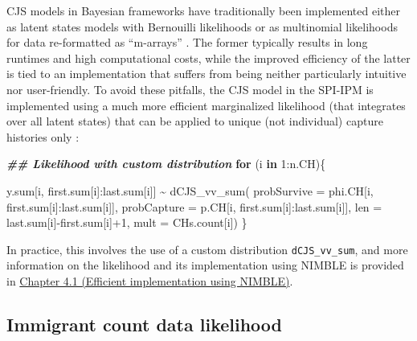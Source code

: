 \documentclass[
]{book}
\newenvironment{Shaded}{\begin{snugshade}}{\end{snugshade}}
\newcommand{\AttributeTok}[1]{\textcolor[rgb]{0.77,0.63,0.00}{#1}}
\newcommand{\ControlFlowTok}[1]{\textcolor[rgb]{0.13,0.29,0.53}{\textbf{#1}}}
\newcommand{\DecValTok}[1]{\textcolor[rgb]{0.00,0.00,0.81}{#1}}
\newcommand{\DocumentationTok}[1]{\textcolor[rgb]{0.56,0.35,0.01}{\textbf{\textit{#1}}}}
\newcommand{\FunctionTok}[1]{\textcolor[rgb]{0.00,0.00,0.00}{#1}}
\newcommand{\NormalTok}[1]{#1}
\newcommand{\SpecialCharTok}[1]{\textcolor[rgb]{0.00,0.00,0.00}{#1}}
\begin{document}
CJS models in Bayesian frameworks have traditionally been implemented either as latent states models with Bernouilli likelihoods or as multinomial likelihoods for data re-formatted as ``m-arrays'' \citep{gimenez2007, kery2011}. The former typically results in long runtimes and high computational costs, while the improved efficiency of the latter is tied to an implementation that suffers from being neither particularly intuitive nor user-friendly. To avoid these pitfalls, the CJS model in the SPI-IPM is implemented using a much more efficient marginalized likelihood (that integrates over all latent states) that can be applied to unique (not individual) capture histories only \citep[following][]{turek2016}:

\begin{Shaded}
\begin{Highlighting}[]
\DocumentationTok{\#\# Likelihood with custom distribution}
\ControlFlowTok{for}\NormalTok{ (i }\ControlFlowTok{in} \DecValTok{1}\SpecialCharTok{:}\NormalTok{n.CH)\{}

\NormalTok{  y.sum[i, first.sum[i]}\SpecialCharTok{:}\NormalTok{last.sum[i]] }\SpecialCharTok{\textasciitilde{}} \FunctionTok{dCJS\_vv\_sum}\NormalTok{(}
      \AttributeTok{probSurvive =}\NormalTok{ phi.CH[i, first.sum[i]}\SpecialCharTok{:}\NormalTok{last.sum[i]],}
      \AttributeTok{probCapture =}\NormalTok{ p.CH[i, first.sum[i]}\SpecialCharTok{:}\NormalTok{last.sum[i]],}
      \AttributeTok{len =}\NormalTok{ last.sum[i]}\SpecialCharTok{{-}}\NormalTok{first.sum[i]}\SpecialCharTok{+}\DecValTok{1}\NormalTok{,}
      \AttributeTok{mult =}\NormalTok{ CHs.count[i])}
\NormalTok{\}}
\end{Highlighting}
\end{Shaded}

In practice, this involves the use of a custom distribution \texttt{dCJS\_vv\_sum}, and more information on the likelihood and its implementation using NIMBLE is provided in \protect\hyperlink{ux5cux23ux5cux2520Efficientux5cux2520implementationux5cux2520usingux5cux2520NIMBLE}{Chapter 4.1 (Efficient implementation using NIMBLE)}.

\hypertarget{immigrant-count-data-likelihood}{%
\subsection{Immigrant count data likelihood}\label{immigrant-count-data-likelihood}}
\end{document}
